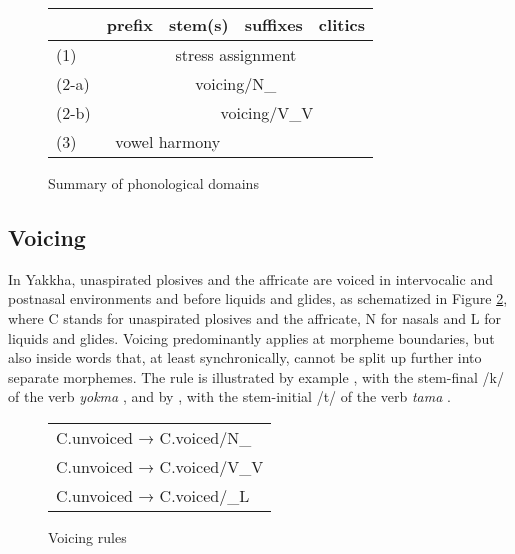 

\begin{figure}[htp]
\begin{center}
\begin{tabular}{lllll} 
	&{\bf prefix}&{\bf stem(s)}&{\bf suffixes}&{\bf clitics}\\
\midrule
\cline{3-4}
(1)	&	&\multicolumn{2}{|c|}{stress assignment}&\\
\cline{2-5}
(2-a)&	\multicolumn{4}{|c|}{voicing/N\_}\\
\cline{2-5}
(2-b)&	&\multicolumn{3}{|c|}{voicing/V\_V}\\
\cline{2-5}
(3)&\multicolumn{2}{|c|}{vowel harmony}&&\\
\cline{2-3}
\end{tabular}
\caption{Summary of phonological domains}\label{w-domains}
\end{center}
\end{figure}


\subsection{Voicing}\label{voicing}

In Yakkha, unaspirated plosives and the affricate are voiced in intervocalic and postnasal environments and before liquids and glides, as schematized in Figure \ref{voic-fig}, where C stands for unaspirated plosives and the affricate, N for nasals and L for liquids and glides. Voicing predominantly  applies at morpheme boundaries, but also inside words that, at least synchronically, cannot be split up further into separate morphemes. The rule is illustrated by example \Next, with the stem-final /k/ of the verb \emph{yokma} , and by \NNext, with the stem-initial /t/ of the verb \emph{tama} . 

\begin{figure}[htp]	
\begin{center}		
\begin{tabular}{l}
\hline
C.{\sc unvoiced} → C.{\sc voiced}/N\_\\
C.{\sc unvoiced} → C.{\sc voiced}/V\_V\\ 
C.{\sc unvoiced} → C.{\sc voiced}/\_L\\
\hline
\end{tabular}
\caption{Voicing rules}\label{voic-fig}
\end{center}
\end{figure}


